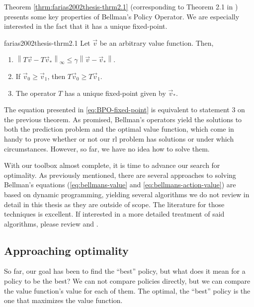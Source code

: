 Theorem \ref{thrm:farias2002thesis-thrm2.1} (corresponding to Theorem 2.1 in
\cite[Ch.~2.2]{farias2002thesis}) presents some key properties of Bellman's
Policy Operator. We are especially interested in the fact that it has a unique
fixed-point.

\begin{thrm}{}{farias2002thesis-thrm2.1}
    Let $\vec{v}$ be an arbitrary value function. Then,
    \begin{enumerate}
        \item $\left\| T\vec{v} - T \vec{v}_* \right\|_{\infty} \leq \gamma
            \left\| \vec{v} - \vec{v}_* \right\|$.
        \item If $\vec{v}_0 \geq \vec{v}_1$, then $T\vec{v}_0 \geq T\vec{v}_1$.
        \item The operator $T$ has a unique fixed-point given by $\vec{v}_*$.
    \end{enumerate}
\end{thrm}

The equation presented in \eqref{eq:BPO-fixed-point} is equivalent to statement
3 on the previous theorem. As promised, Bellman's operators yield the solutions
to both the prediction problem and the optimal value function, which come in
handy to prove whether or not our \ac{rl} problem has solutions or under which
circumstances. However, so far, we have no idea how to solve them.

With our toolbox almost complete, it is time to advance our search for
optimality. As previously mentioned, there are several approaches to solving
Bellman's equations (\eqref{eq:bellmans-value} and
\eqref{eq:bellmans-action-value}) are based on dynamic programming, yielding
several algorithms we do not review in detail in this thesis as they are outside
of scope. The literature for those techniques is excellent. If interested in a
more detailed treatment of said algorithms, please review \cite{SuttonBarto} and
\cite{raoRL4F}.

\subsection{Approaching optimality}

So far, our goal has been to find the ``best'' policy, but what does it mean for
a policy to be the best? We can not compare policies directly, but we can
compare the value function's value for each of them. The optimal, the
``best'' policy is the one that maximizes the value function.

